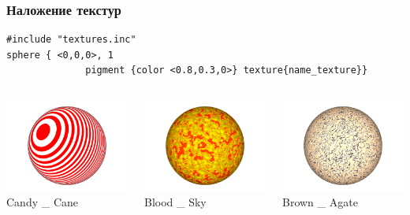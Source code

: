 \documentclass{beamer}
\begin{document}
\begin{frame}[fragile]
\frametitle{Наложение текстур}
\begin{verbatim}
#include "textures.inc"
sphere { <0,0,0>, 1 
			  pigment {color <0.8,0.3,0>} texture{name_texture}}
\end{verbatim}
\begin{columns}
	\begin{column}{4cm}	
		\includegraphics[width=4 cm]{moon_candy.png}
		\center
		\\Candy \_ Cane
	\end{column}
	\begin{column}{4cm}	
		\includegraphics[width=4 cm]{moon_Blood_Sky.png}
		\center
		\\Blood \_ Sky
	\end{column}
	\begin{column}{4cm}	
		\includegraphics[width=4 cm]{moon_Brown_Agate.png}
		\center
		\\Brown \_ Agate
	\end{column}
\end{columns}
\end{frame}

\end{document}
